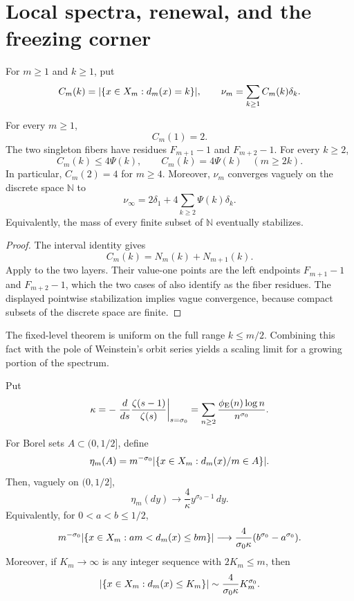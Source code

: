 \ifdefined\supplementonly
\else
\section{Local spectra, renewal, and the freezing corner}
\label{sec:local-spectrum}

For \(m\ge1\) and \(k\ge1\), put
\[
 C_m(k)=\lvert \{x\in X_m:d_m(x)=k\} \rvert,
 \qquad
 \nu_m=\sum_{k\ge1}C_m(k)\delta_k.
\]

\begin{theorem}
\label{thm:local-fiber-spectrum}
For every \(m\ge1\),
\[
 C_m(1)=2.
\]
The two singleton fibers have residues \(F_{m+1}-1\) and \(F_{m+2}-1\).
For every \(k\ge2\),
\[
 C_m(k)\le4\Psi(k),
 \qquad C_m(k)=4\Psi(k)\quad(m\ge2k).
\]
In particular, \(C_m(2)=4\) for \(m\ge4\).  Moreover, \(\nu_m\) converges
vaguely on the discrete space \(\mathbb N\) to
\[
 \nu_\infty=2\delta_1+4\sum_{k\ge2}\Psi(k)\delta_k.
\]
Equivalently, the mass of every finite subset of \(\mathbb N\) eventually
stabilizes.
\end{theorem}

\begin{proof}
The interval identity gives
\begin{equation}
 C_m(k)=N_m(k)+N_{m+1}(k).
 \label{eq:fiber-level-two-layer-count}
\end{equation}
Apply  to the two layers.  Their value-one
points are the left endpoints \(F_{m+1}-1\) and \(F_{m+2}-1\), which the
two cases of  also identify as the fiber
residues.  The displayed pointwise stabilization implies vague convergence,
because compact subsets of the discrete space are finite.
\end{proof}

The fixed-level theorem is uniform on the full range \(k\le m/2\).
Combining this fact with the pole of Weinstein's orbit series yields a
scaling limit for a growing portion of the spectrum.

Put
\[
 \kappa=-\left.\frac{d}{ds}\frac{\zeta(s-1)}{\zeta(s)}
 \right|_{s=\sigma_0}
 =\sum_{n\ge2}\frac{\phi_{\rm E}(n)\log n}{n^{\sigma_0}}.
\]

\begin{theorem}
\label{thm:mesoscopic-fiber-spectrum}
For Borel sets \(A\subset(0,1/2]\), define
\[
 \eta_m(A)=m^{-\sigma_0}
 \lvert \{x\in X_m:d_m(x)/m\in A\} \rvert.
\]
Then, vaguely on \((0,1/2]\),
\begin{equation}
 \eta_m(dy)\longrightarrow \frac4\kappa y^{\sigma_0-1}\,dy.
 \label{eq:mesoscopic-vague-limit}
\end{equation}
Equivalently, for \(0<a<b\le1/2\),
\[
 m^{-\sigma_0}\lvert \{x\in X_m:am<d_m(x)\le bm\} \rvert
 \longrightarrow
 \frac4{\sigma_0\kappa}(b^{\sigma_0}-a^{\sigma_0}).
\]
Moreover, if \(K_m\to\infty\) is any integer sequence with \(2K_m\le m\),
then
\begin{equation}
 \lvert \{x\in X_m:d_m(x)\le K_m\} \rvert
 \sim\frac4{\sigma_0\kappa}K_m^{\sigma_0}.
 \label{eq:mesoscopic-moving-cutoff}
\end{equation}
\end{theorem}


